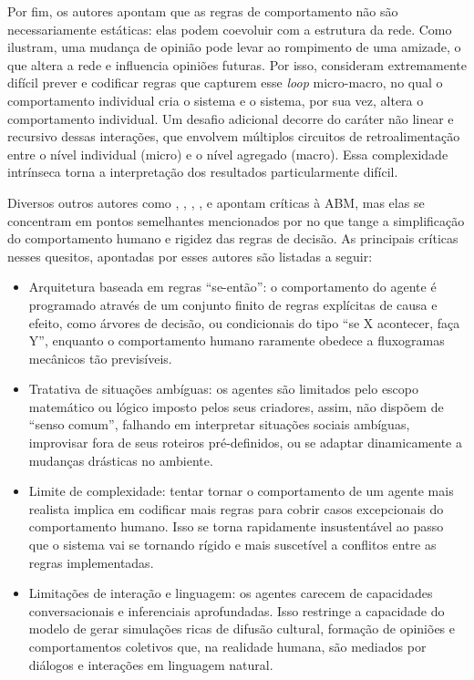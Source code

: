 \documentclass[12pt,oneside,a4paper,brazil,sumario=tradicional]{abntex2}
\begin{document}
Por fim, os autores apontam que as regras de comportamento não são necessariamente estáticas: elas podem coevoluir com a estrutura da rede. Como ilustram, uma mudança de opinião pode levar ao rompimento de uma amizade, o que altera a rede e influencia opiniões futuras. Por isso, consideram extremamente difícil prever e codificar regras que capturem esse \textit{loop} micro-macro, no qual o comportamento individual cria o sistema e o sistema, por sua vez, altera o comportamento individual. Um desafio adicional decorre do caráter não linear e recursivo dessas interações, que envolvem múltiplos circuitos de retroalimentação entre o nível individual (micro) e o nível agregado (macro). Essa complexidade intrínseca torna a interpretação dos resultados particularmente difícil.

Diversos outros autores como , , , , e  apontam críticas à ABM, mas elas se concentram em pontos semelhantes mencionados por  no que tange a simplificação do comportamento humano e rigidez das regras de decisão. As principais críticas nesses quesitos, apontadas por esses autores são listadas a seguir:

\begin{itemize}
  \item Arquitetura baseada em regras “se-então”: o comportamento do agente é programado através de um conjunto finito de regras explícitas de causa e efeito, como árvores de decisão, ou condicionais do tipo “se X acontecer, faça Y”, enquanto o comportamento humano raramente obedece a fluxogramas mecânicos tão previsíveis.
  \item Tratativa de situações ambíguas: os agentes são limitados pelo escopo matemático ou lógico imposto pelos seus criadores, assim, não dispõem de “senso comum”, falhando em interpretar situações sociais ambíguas, improvisar fora de seus roteiros pré-definidos, ou se adaptar dinamicamente a mudanças drásticas no ambiente.
  \item Limite de complexidade: tentar tornar o comportamento de um agente mais realista implica em codificar mais regras para cobrir casos excepcionais do comportamento humano. Isso se torna rapidamente insustentável ao passo que o sistema vai se tornando rígido e mais suscetível a conflitos entre as regras implementadas.
  \item Limitações de interação e linguagem: os agentes carecem de capacidades conversacionais e inferenciais aprofundadas. Isso restringe a capacidade do modelo de gerar simulações ricas de difusão cultural, formação de opiniões e comportamentos coletivos que, na realidade humana, são mediados por diálogos e interações em linguagem natural.
\end{itemize}
\end{document}
